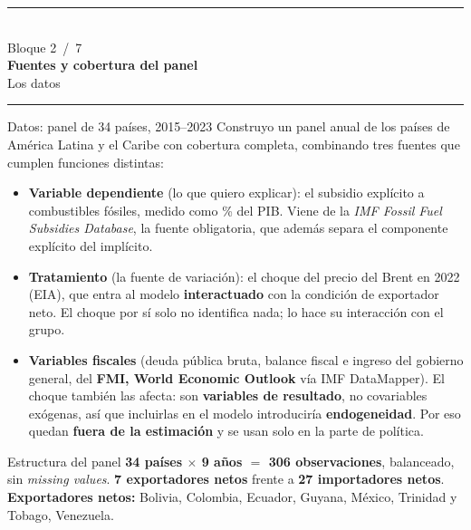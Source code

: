 \documentclass[aspectratio=169,10pt]{beamer}
\newcommand{\key}[1]{{\bfseries\color{AcentoRojo}#1}}
\newcommand{\divisor}[3]{%
  {\setbeamertemplate{footline}{}%
   \begin{frame}[plain]
     \vfill
     \begin{center}
       {\color{AcentoRojo}\rule{2.6cm}{1.2pt}}\\[0.7em]
       {\scriptsize\color{GrisMedio}Bloque #1 \,/\, 7}\\[0.6em]
       {\Large\color{Carbon}\bfseries #2}\\[0.45em]
       {\color{GrisMedio}#3}\\[0.7em]
       {\color{AcentoRojo}\rule{2.6cm}{1.2pt}}
     \end{center}
     \vfill
   \end{frame}}}
\begin{document}
\divisor{2}{Fuentes y cobertura del panel}{Los datos}

\begin{frame}{Datos: panel de 34 países, 2015--2023}
  \small
  Construyo un panel anual de los países de América Latina y el Caribe con cobertura completa,
  combinando tres fuentes que cumplen funciones distintas:
  \begin{itemize}
    \item \textbf{Variable dependiente} (lo que quiero explicar): el subsidio explícito a
          combustibles fósiles, medido como \% del PIB. Viene de la \emph{IMF Fossil Fuel
          Subsidies Database}, la fuente obligatoria, que además separa el componente explícito
          del implícito.
    \item \textbf{Tratamiento} (la fuente de variación): el choque del precio del Brent en 2022
          (EIA), que entra al modelo \textbf{interactuado} con la condición de exportador neto.
          El choque por sí solo no identifica nada; lo hace su interacción con el grupo.
    \item \textbf{Variables fiscales} (deuda pública bruta, balance fiscal e ingreso del
          gobierno general, del \textbf{FMI, World Economic Outlook} vía IMF DataMapper). El choque
          también las afecta: son \textbf{variables de resultado}, no covariables exógenas, así que
          incluirlas en el modelo introduciría \textbf{endogeneidad}. Por eso quedan \textbf{fuera
          de la estimación} y se usan solo en la parte de política.
  \end{itemize}

  \begin{block}{Estructura del panel}
    \key{34 países $\times$ 9 años $=$ 306 observaciones}, balanceado, sin \emph{missing values}.
    \textbf{7 exportadores netos} frente a \textbf{27 importadores netos}.\\[0.3em]
    \textbf{Exportadores netos:} Bolivia, Colombia, Ecuador, Guyana, México, Trinidad y Tobago,
    Venezuela.
  \end{block}

\end{frame}
\end{document}
